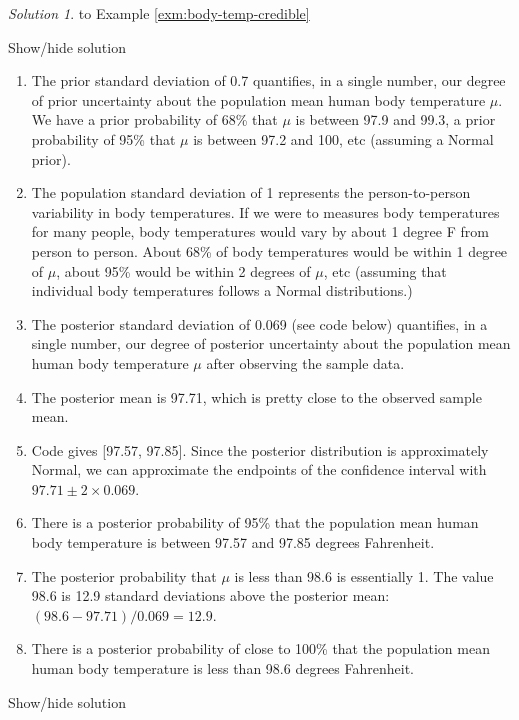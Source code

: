 \documentclass[
]{book}
\providecommand{\tightlist}{%
  \setlength{\itemsep}{0pt}\setlength{\parskip}{0pt}}
\theoremstyle{definition}
\theoremstyle{definition}
\theoremstyle{definition}
\theoremstyle{remark}
\newtheorem*{solution}{Solution}
\begin{document}
\begin{solution}
{}to Example \ref{exm:body-temp-credible}
\end{solution}

Show/hide solution

\begin{enumerate}
\def\labelenumi{\arabic{enumi}.}
\tightlist
\item
  The prior standard deviation of 0.7 quantifies, in a single number, our degree of prior uncertainty about the population mean human body temperature \(\mu\). We have a prior probability of 68\% that \(\mu\) is between 97.9 and 99.3, a prior probability of 95\% that \(\mu\) is between 97.2 and 100, etc (assuming a Normal prior).
\item
  The population standard deviation of 1 represents the person-to-person variability in body temperatures. If we were to measures body temperatures for many people, body temperatures would vary by about 1 degree F from person to person. About 68\% of body temperatures would be within 1 degree of \(\mu\), about 95\% would be within 2 degrees of \(\mu\), etc (assuming that individual body temperatures follows a Normal distributions.)
\item
  The posterior standard deviation of 0.069 (see code below) quantifies, in a single number, our degree of posterior uncertainty about the population mean human body temperature \(\mu\) after observing the sample data.
\item
  The posterior mean is 97.71, which is pretty close to the observed sample mean.
\item
  Code gives {[}97.57, 97.85{]}. Since the posterior distribution is approximately Normal, we can approximate the endpoints of the confidence interval with \(97.71 \pm 2 \times 0.069\).
\item
  There is a posterior probability of 95\% that the population mean human body temperature is between 97.57 and 97.85 degrees Fahrenheit.
\item
  The posterior probability that \(\mu\) is less than 98.6 is essentially 1. The value 98.6 is 12.9 standard deviations above the posterior mean: \((98.6 - 97.71)/0.069=12.9\).
\item
  There is a posterior probability of close to 100\% that the population mean human body temperature is less than 98.6 degrees Fahrenheit.
\end{enumerate}

Show/hide solution
\end{document}
